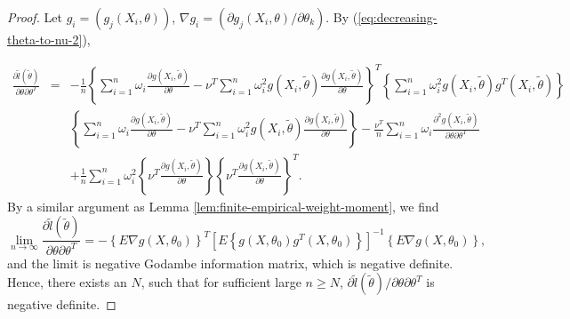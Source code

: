 \begin{proof}
Let $g_{i}=\left(g_{j}\left(X_{i},\theta\right)\right)$, $\nabla g_{i}=\left({\partial g_{j}\left(X_{i},\theta\right)} / {\partial\theta_{k}}\right)$. By (\ref{eq:decreasing-theta-to-nu-2}), 

\begin{eqnarray*}
\frac{\partial\tilde{l}\left(\tilde{\theta}\right)}{\partial\theta\partial\theta^{T}}&=&-\frac{1}{n}\left\{ \sum_{i=1}^{n}\omega_{i}\frac{\partial g\left(X_{i},\tilde{\theta}\right)}{\partial\theta}-\nu^{T}\sum_{i=1}^{n}\omega_{i}^{2}g\left(X_{i},\tilde{\theta}\right)\frac{\partial g\left(X_{i},\tilde{\theta}\right)}{\partial\theta}\right\} ^{T}\left\{ \sum_{i=1}^{n}\omega_{i}^{2}g\left(X_{i},\tilde{\theta}\right)g^{T}\left(X_{i},\tilde{\theta}\right)\right\} \\&&\left\{ \sum_{i=1}^{n}\omega_{i}\frac{\partial g\left(X_{i},\tilde{\theta}\right)}{\partial\theta}-\nu^{T}\sum_{i=1}^{n}\omega_{i}^{2}g\left(X_{i},\tilde{\theta}\right)\frac{\partial g\left(X_{i},\tilde{\theta}\right)}{\partial\theta}\right\} -\frac{\nu^{T}}{n}\sum_{i=1}^{n}\omega_{i}\frac{\partial^{2}g\left(X_{i},\tilde{\theta}\right)}{\partial\theta\partial\theta^{T}}\\&&+\frac{1}{n}\sum_{i=1}^{n}\omega_{i}^{2}\left\{ \nu^{T}\frac{\partial g\left(X_{i},\tilde{\theta}\right)}{\partial\theta}\right\} \left\{ \nu^{T}\frac{\partial g\left(X_{i},\tilde{\theta}\right)}{\partial\theta}\right\} ^{T}.
\end{eqnarray*}
By a similar argument as Lemma \ref{lem:finite-empirical-weight-moment}, we find 
\[
   \lim_{n\rightarrow\infty} \frac{\partial\tilde{l}\left(\tilde{\theta}\right)}{\partial\theta\partial\theta^{T}} = -\left\{E\nabla g (X,\theta_0) \right\}^T \left[E\left\{g (X,\theta_0)g^T (X,\theta_0)\right\}\right]^{-1} \left\{E\nabla g (X,\theta_0)\right\},
\]
and the limit is negative Godambe information matrix, which is negative definite. Hence, there exists an $N$, such that for sufficient large $n\ge N$, ${\partial\tilde{l}\left(\tilde{\theta}\right)} / {\partial\theta\partial\theta^{T}}$ is negative definite.


\end{proof}
